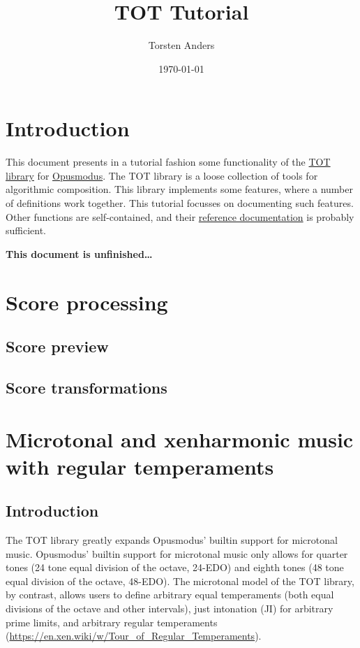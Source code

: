 \documentclass[11pt]{article}
\author{Torsten Anders}
\date{\today}
\title{TOT Tutorial}
\begin{document}
\maketitle
\setcounter{tocdepth}{4}
\tableofcontents


\section{Introduction}
\label{sec:org7d02128}

This document presents in a tutorial fashion some functionality of the \href{https://github.com/tanders/tot}{TOT library} for
\href{http://opusmodus.com/}{Opusmodus}. The TOT library is a loose collection of tools for algorithmic composition. This library
implements some features, where a number of definitions work together. This tutorial focusses on
documenting such features. Other functions are self-contained, and their \href{../reference/index.html}{reference documentation}
is probably sufficient.


\textbf{This document is unfinished\ldots{}}


\section{Score processing}
\label{sec:org8483fd7}

\subsection{Score preview}
\label{sec:org0fdfbc6}


\subsection{Score transformations}
\label{sec:org81445f3}


\section{Microtonal and xenharmonic music with regular temperaments}
\label{sec:org9ac9947}

\subsection{Introduction}
\label{sec:org721d557}

The TOT library greatly expands Opusmodus' builtin support for microtonal music.  Opusmodus'
builtin support for microtonal music only allows for quarter tones (24 tone equal division of
the octave, 24-EDO) and eighth tones (48 tone equal division of the octave, 48-EDO). The
microtonal model of the TOT library, by contrast, allows users to define arbitrary equal
temperaments (both equal divisions of the octave and other intervals), just intonation (JI) for
arbitrary prime limits, and arbitrary regular temperaments
(\url{https://en.xen.wiki/w/Tour\_of\_Regular\_Temperaments}). 
\end{document}
